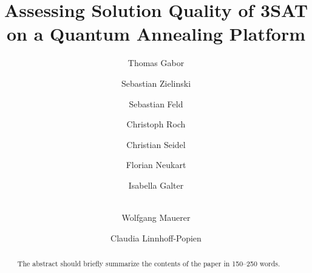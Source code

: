 \documentclass[runningheads]{llncs}
\begin{document}
%
\title{Assessing Solution Quality of 3SAT\\on a Quantum Annealing Platform}
%
%
\author{Thomas Gabor \and
Sebastian Zielinski \and
Sebastian Feld \and
Christoph Roch \and
Christian Seidel \and
Florian Neukart \and
Isabella Galter \and\\
Wolfgang Mauerer \and
Claudia Linnhoff-Popien}
%
%
%
\maketitle              %
%
\begin{abstract}
The abstract should briefly summarize the contents of the paper in
150--250 words.

\end{abstract}
%
%
%






%
%
%


%
\end{document}
